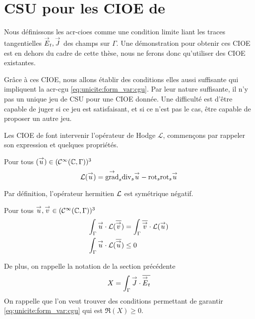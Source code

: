 \section[CSU pour les CIOE de Stupfel et Poget 2011]{CSU pour les CIOE de \cite{stupfel_sufficient_2011}}

  Nous définissons les \glspl{acr-cioe} comme une condition limite liant les traces tangentielles \({\overset{\rightarrow}{E}}_t, {\overset{\rightarrow}{J}}\) des champs sur \(\Gamma\). Une démonstration pour obtenir ces CIOE est en dehors du cadre de cette thèse, nous ne ferons donc qu'utiliser des CIOE existantes. 

  Grâce à ces CIOE, nous allons établir des conditions elles aussi suffisante qui impliquent la \gls{acr-cgu} \eqref{eq:unicite:form_var:cgu}. Par leur nature suffisante, il n'y pas un unique jeu de CSU pour une CIOE donnée. Une difficulté est d'être capable de juger si ce jeu est satisfaisant, et si ce n'est pas le cas, être capable de proposer un autre jeu.

  Les CIOE de \cite{stupfel_sufficient_2011} font intervenir l'opérateur de Hodge \(\mathcal{L}\), commençons par rappeler son expression et quelques propriétés.

  \begin{defn}
    Pour tous \(({\overset{\rightarrow}{u}}) \in (\mathcal C^\infty(\mathbb C,\Gamma))^3\)
    \begin{equation}
      \mathcal{L}({\overset{\rightarrow}{u}}) = {{\overset{\rightarrow}{\operatorname{grad}}}_s}{{\operatorname{div}_s} {\overset{\rightarrow}{u}}} - {{\operatorname{rot}}_s}{{{\operatorname{rot}}_s} {\overset{\rightarrow}{u}}}
    \end{equation}
  \end{defn}

  \begin{prop}
    Par définition, l’opérateur hermitien \(\mathcal{L}\) est symétrique négatif.

    Pour tous \({\overset{\rightarrow}{u}},{\overset{\rightarrow}{v}} \in (\mathcal C^\infty(\mathbb C,\Gamma))^3\)
    \begin{align}
      \int_\Gamma {\overset{\rightarrow}{u}}\cdot \mathcal{L}({\overline{{\overset{\rightarrow}{v}}}}) &= \int_\Gamma {\overline{{\overset{\rightarrow}{v}}}}\cdot \mathcal{L}({\overset{\rightarrow}{u}})
      \\
      \int_\Gamma {\overset{\rightarrow}{u}}\cdot \mathcal{L}({\overline{{\overset{\rightarrow}{u}}}}) &\le 0
    \end{align}
  \end{prop}

  De plus, on rappelle la notation de la section précédente
  \begin{equation}
    X = \int_\Gamma {\overset{\rightarrow}{J}} \cdot {\overline{{\overset{\rightarrow}{E}}_t}}
    \label{eq:unicite:2011:X}
  \end{equation}
  On rappelle que l'on veut trouver des conditions permettant de garantir \eqref{eq:unicite:form_var:cgu} qui est \(\Re(X)\ge0\).


